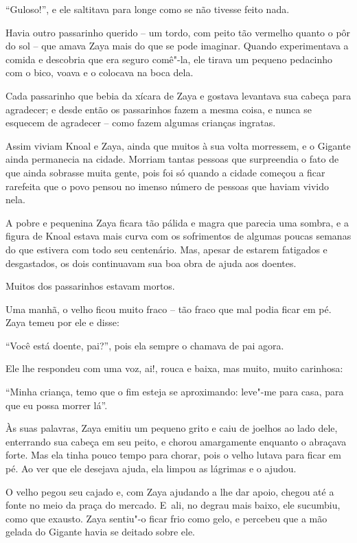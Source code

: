 ``Guloso!'', e ele saltitava para longe como se não tivesse feito nada.

Havia outro passarinho querido -- um tordo, com peito tão vermelho
quanto o pôr do sol -- que amava Zaya mais do que se pode imaginar.
Quando experimentava a comida e descobria que era seguro comê"-la, ele
tirava um pequeno pedacinho com o bico, voava e o colocava na boca dela.

Cada passarinho que bebia da xícara de Zaya e gostava levantava sua
cabeça para agradecer; e desde então os passarinhos fazem a mesma coisa,
e nunca se esquecem de agradecer -- como fazem algumas crianças
ingratas.

Assim viviam Knoal e Zaya, ainda que muitos à sua volta morressem, e o
Gigante ainda permanecia na cidade. Morriam tantas pessoas que
surpreendia o fato de que ainda sobrasse muita gente, pois foi só quando
a cidade começou a ficar rarefeita que o povo pensou no imenso número de
pessoas que haviam vivido nela.

A pobre e pequenina Zaya ficara tão pálida e magra que parecia uma
sombra, e a figura de Knoal estava mais curva com os sofrimentos de
algumas poucas semanas do que estivera com todo seu centenário. Mas,
apesar de estarem fatigados e desgastados, os dois continuavam sua boa
obra de ajuda aos doentes.

Muitos dos passarinhos estavam mortos.

Uma manhã, o velho ficou muito fraco -- tão fraco que mal podia ficar em
pé. Zaya temeu por ele e disse:

``Você está doente, pai?'', pois ela sempre o chamava de pai agora.

Ele lhe respondeu com uma voz, ai!, rouca e baixa, mas muito, muito
carinhosa:

``Minha criança, temo que o fim esteja se aproximando: leve"-me para
casa, para que eu possa morrer lá''.

Às suas palavras, Zaya emitiu um pequeno grito e caiu de joelhos ao lado
dele, enterrando sua cabeça em seu peito, e chorou amargamente enquanto
o abraçava forte. Mas ela tinha pouco tempo para chorar, pois o velho
lutava para ficar em pé. Ao ver que ele desejava ajuda, ela limpou as
lágrimas e o ajudou.

O velho pegou seu cajado e, com Zaya ajudando a lhe dar apoio, chegou
até a fonte no meio da praça do mercado. E~ali, no degrau mais baixo,
ele sucumbiu, como que exausto. Zaya sentiu"-o ficar frio como gelo, e
percebeu que a mão gelada do Gigante havia se deitado sobre ele.

